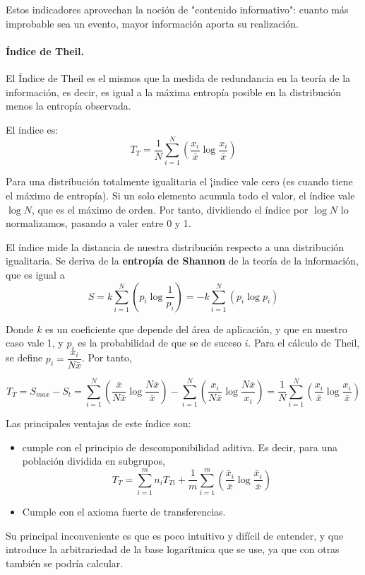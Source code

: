 


Estos indicadores aprovechan la noci\'on de "contenido informativo": cuanto m\'as improbable sea un evento, mayor informaci\'on aporta su realizaci\'on.

\paragraph{\'Indice de Theil.}

El \'Indice de Theil es el mismos que la medida de redundancia en la teor\'ia de la informaci\'on, es decir, es igual a la m\'axima entrop\'ia posible en la distribuci\'on menos la entrop\'ia observada.

El \'indice es:
\[T_T=\dfrac{1}{N}\sum_{i=1}^N\left(\dfrac{x_i}{\bar{x}}\log{\dfrac{x_i}{\bar{x}}}\right)\]

Para una distribuci\'on totalmente igualitaria el \'¡indice vale cero (es cuando tiene el m\'aximo de entrop\'ia). Si un solo elemento acumula todo el valor, el \'indice vale $\log{N}$, que es el m\'aximo de orden. Por tanto, dividiendo el \'indice por $\log{N}$ lo normalizamos, pasando a valer entre 0 y 1.

El \'indice mide la distancia de nuestra distribuci\'on respecto a una distribuci\'on igualitaria. Se deriva de la \textbf{entrop\'ia de Shannon} de la teor\'ia de la informaci\'on, que es igual a 
\[S=k\sum_{i=1}^N\left(p_i\log{\dfrac{1}{p_i}}\right)=-k\sum_{i=1}^N\left(p_i\log{p_i}\right)\]

Donde $k$ es un coeficiente que depende del \'area de aplicaci\'on, y que en nuestro caso vale 1, y $p_i$ es la probabilidad de que se de suceso $i$. Para el c\'alculo de Theil, se define $p_i=\dfrac{x_i}{N\bar{x}}$. Por tanto, 

\[T_T=S_{max}-S_t=\sum_{i=1}^N\left(\dfrac{\bar{x}}{N\bar{x}}\log{\dfrac{N\bar{x}}{\bar{x}}}\right)-\sum_{i=1}^N\left(\dfrac{x_i}{N\bar{x}}\log{\dfrac{N\bar{x}}{x_i}}\right)=\dfrac{1}{N}\sum_{i=1}^N\left(\dfrac{x_i}{\bar{x}}\log{\dfrac{x_i}{\bar{x}}}\right)\]

Las principales ventajas de este \'indice  son:

\begin{itemize}
\item cumple con el principio de descomponibilidad aditiva. Es decir, para una poblaci\'on dividida en subgrupos,
\[T_T=\sum_{i=1}^mn_iT_{Ti}+\dfrac{1}{m}\sum_{i=1}^m\left(\dfrac{\bar{x}_i}{\bar{x}}\log{\dfrac{\bar{x}_i}{\bar{x}}}\right)\]

\item Cumple con el axioma fuerte de transferencias.

\end{itemize}

Su principal inconveniente es que es poco intuitivo y dif\'icil de entender, y que introduce la arbitrariedad de la base logar\'itmica que se use, ya que con otras tambi\'en se podr\'ia calcular.








